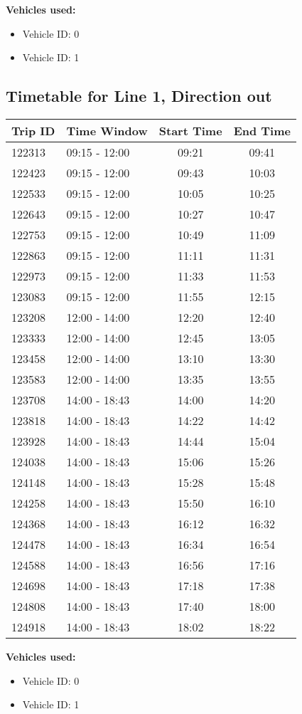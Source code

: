 \documentclass{article}
\begin{document}
\textbf{Vehicles used:}
\begin{itemize}
  \item Vehicle ID: 0
  \item Vehicle ID: 1
\end{itemize}

\subsection*{Timetable for Line 1, Direction out}
\begin{tabular}{llcc}
\toprule
Trip ID & Time Window & Start Time & End Time \\
\midrule
122313 & 09:15 - 12:00 & 09:21 & 09:41 \\
122423 & 09:15 - 12:00 & 09:43 & 10:03 \\
122533 & 09:15 - 12:00 & 10:05 & 10:25 \\
122643 & 09:15 - 12:00 & 10:27 & 10:47 \\
122753 & 09:15 - 12:00 & 10:49 & 11:09 \\
122863 & 09:15 - 12:00 & 11:11 & 11:31 \\
122973 & 09:15 - 12:00 & 11:33 & 11:53 \\
123083 & 09:15 - 12:00 & 11:55 & 12:15 \\
123208 & 12:00 - 14:00 & 12:20 & 12:40 \\
123333 & 12:00 - 14:00 & 12:45 & 13:05 \\
123458 & 12:00 - 14:00 & 13:10 & 13:30 \\
123583 & 12:00 - 14:00 & 13:35 & 13:55 \\
123708 & 14:00 - 18:43 & 14:00 & 14:20 \\
123818 & 14:00 - 18:43 & 14:22 & 14:42 \\
123928 & 14:00 - 18:43 & 14:44 & 15:04 \\
124038 & 14:00 - 18:43 & 15:06 & 15:26 \\
124148 & 14:00 - 18:43 & 15:28 & 15:48 \\
124258 & 14:00 - 18:43 & 15:50 & 16:10 \\
124368 & 14:00 - 18:43 & 16:12 & 16:32 \\
124478 & 14:00 - 18:43 & 16:34 & 16:54 \\
124588 & 14:00 - 18:43 & 16:56 & 17:16 \\
124698 & 14:00 - 18:43 & 17:18 & 17:38 \\
124808 & 14:00 - 18:43 & 17:40 & 18:00 \\
124918 & 14:00 - 18:43 & 18:02 & 18:22 \\
\bottomrule
\end{tabular}

\textbf{Vehicles used:}
\begin{itemize}
  \item Vehicle ID: 0
  \item Vehicle ID: 1
\end{itemize}
\end{document}
